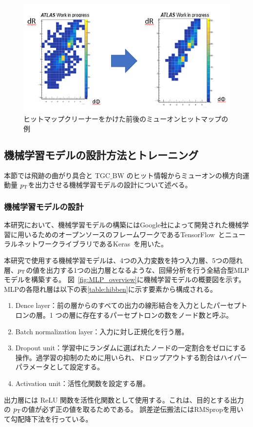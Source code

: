 \begin{figure}[tb]
  \centering
  \includegraphics[clip, width=14cm]{fig/4/cleaner.png}
  \caption{ヒットマップクリーナーをかけた前後のミューオンヒットマップの例}
  \label{fig:hitmapcleaner}
\end{figure}


\subsection{機械学習モデルの設計方法とトレーニング}
本節では飛跡の曲がり具合と TGC$\_$BW のヒット情報からミューオンの横方向運動量 $p_{\rm{T}}$を出力させる機械学習モデルの設計について述べる。

\subsubsection{機械学習モデルの設計}
本研究において、機械学習モデルの構築にはGoogle社によって開発された機械学習に用いるためのオープンソースのフレームワークであるTensorFlow~\cite{article:TensorFlow}とニューラルネットワークライブラリであるKeras~\cite{article:keras}を用いた。

本研究で使用する機械学習モデルは、4つの入力変数を持つ入力層、5つの隠れ層、$p_{\rm{T}}$の値を出力する1つの出力層となるような、回帰分析を行う全結合型MLPモデルを構築する。
図~\ref{fig:MLP_overview}に機械学習モデルの概要図を示す。
MLPの各隠れ層は以下の表\ref{table:hibben}に示す要素から構成される。
\begin{enumerate}\label{table:hibben}
   \item Dence layer：前の層からのすべての出力の線形結合を入力としたパーセプトロンの層。1 つの層に存在するパーセプトロンの数をノード数と呼ぶ。
   \item Batch normalization layer：入力に対し正規化を行う層。
   \item Dropout unit：学習中にランダムに選ばれたノードの一定割合をゼロにする操作。過学習の抑制のために用いられ、ドロップアウトする割合はハイパーパラメータとして設定する。
   \item Activation unit：活性化関数を設定する層。
\end{enumerate}
出力層には ReLU 関数を活性化関数として使用する。これは、目的とする出力の $p_{\rm{T}}$の値が必ず正の値を取るためである。
誤差逆伝搬法にはRMSpropを用いて勾配降下法を行っている。

